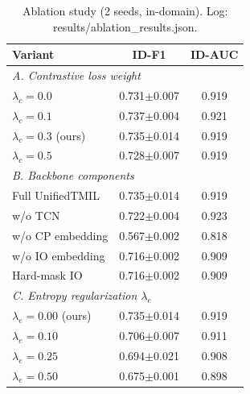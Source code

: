 \begin{table}[!t]
\centering
\caption{Ablation study (2 seeds, in-domain). Log: results/ablation\_results.json.}
\label{tab:abl}
\begin{tabular}{lcc}
\toprule
\textbf{Variant} & \textbf{ID-F1} & \textbf{ID-AUC} \\
\midrule
\multicolumn{3}{l}{\emph{A. Contrastive loss weight}} \\
\quad $\lambda_c=0.0$            & 0.731$\pm$0.007 & 0.919 \\
\quad $\lambda_c=0.1$            & 0.737$\pm$0.004 & 0.921 \\
\quad $\lambda_c=0.3$ (ours)            & 0.735$\pm$0.014 & 0.919 \\
\quad $\lambda_c=0.5$            & 0.728$\pm$0.007 & 0.919 \\
\midrule
\multicolumn{3}{l}{\emph{B. Backbone components}} \\
\quad Full UnifiedTMIL                & 0.735$\pm$0.014 & 0.919 \\
\quad w/o TCN                    & 0.722$\pm$0.004 & 0.923 \\
\quad w/o CP embedding              & 0.567$\pm$0.002 & 0.818 \\
\quad w/o IO embedding              & 0.716$\pm$0.002 & 0.909 \\
\quad Hard-mask IO               & 0.716$\pm$0.002 & 0.909 \\
\midrule
\multicolumn{3}{l}{\emph{C. Entropy regularization $\lambda_e$}} \\
\quad $\lambda_e=0.00$ (ours)           & 0.735$\pm$0.014 & 0.919 \\
\quad $\lambda_e=0.10$           & 0.706$\pm$0.007 & 0.911 \\
\quad $\lambda_e=0.25$           & 0.694$\pm$0.021 & 0.908 \\
\quad $\lambda_e=0.50$           & 0.675$\pm$0.001 & 0.898 \\
\bottomrule
\end{tabular}
\end{table}